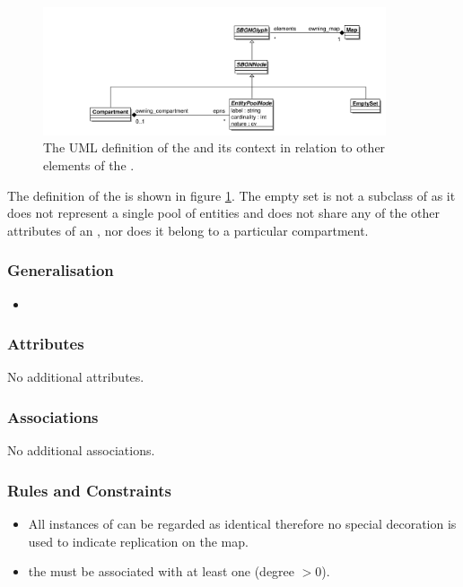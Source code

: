 \begin{figure}[htb]
  \centering
  \includegraphics[width=0.9\textwidth]{images/emptysetuml}
  \caption{The UML definition of the  and its context
    in relation to other elements of the \PDl.}
  \label{fig:techref:emptysetuml}
\end{figure}

The definition of the  is shown in figure
\ref{fig:techref:emptysetuml}. The empty set is not a subclass of  as it does not
represent a single pool of entities and does not share any of the
other attributes of an , nor does it belong to a particular
compartment.

\subsubsection{Generalisation}

\begin{itemize}
\item {}
\end{itemize}

\subsubsection{Attributes}

No additional attributes.

\subsubsection{Associations}

No additional associations.

\subsubsection{Rules and Constraints}

\begin{itemize}
\item  All instances of  can be regarded as identical
therefore no special decoration is used to indicate replication on
the map.
\item the  must be associated with at least
  one  (degree $> 0$).
\end{itemize}


